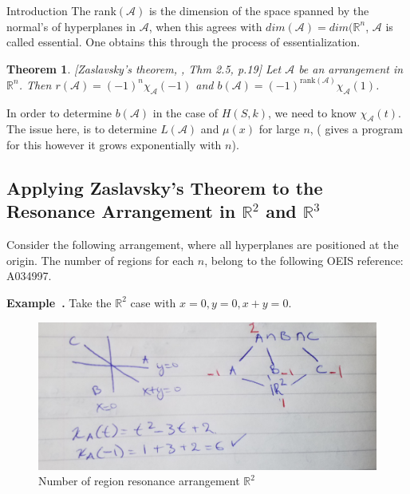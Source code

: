 \documentclass[a4paper,12pt]{article}
\newcounter{example}[]
\newenvironment{example}[1][]{\refstepcounter{example}\par\medskip
   \noindent \textbf{Example~\theexample. #1} \rmfamily}{\medskip}
\newtheorem{theorem}{Theorem}[section]
\theoremstyle{definition}
\theoremstyle{indented}
\begin{document}
\begin{section}{Introduction}
The rank$(\mathcal{A})$ is the dimension of the space spanned by the normal's of hyperplanes in $\mathcal{A}$, when this agrees with $dim(\mathcal{A})=dim(\mathbb{R}^n$, $\mathcal{A}$ is called essential. One obtains this through the process of essentialization.  

\begin{theorem}\label{Zas}[Zaslavsky's theorem, \cite{stanley2004introduction}, Thm 2.5, p.19] Let $\mathcal{A}$ be an arrangement in $\mathbb{R}^n$. Then $r(\mathcal{A})=(-1)^n \chi_{\mathcal{A}} (-1)$ and $b(\mathcal{A})=(-1)^{\text{rank}(\mathcal{A}) }  \chi_{\mathcal{A}} (1)$. 

\end{theorem}

In order to determine $b(\mathcal{A})$ in the case of $H(S,k)$, we need to know $\chi_{{\mathcal{A}}} (t)$. The issue here, is to determine $L(\mathcal{A})$ and $\mu(x)$ for large $n$, (\cite{Etu} gives a program for this however it grows exponentially with $n$). 

\section{Applying Zaslavsky's Theorem to the Resonance Arrangement in $\mathbb{R}^2$ and $\mathbb{R}^3$}

Consider the following arrangement, where all hyperplanes are positioned at the origin. The number of regions for each $n$, belong to the following OEIS reference: A034997.

\begin{example}
Take the $\mathbb{R}^2$ case with $x=0,y=0, x+y=0$. 

\begin{figure}[H]
    \centering
 \includegraphics[scale=0.10,angle=0]{29072020 pics/resonance R2.jpg}  
    \caption{Number of region resonance arrangement $\mathbb{R}^2$}
    \label{res}
\end{figure}
\end{example}



\end{section}
\end{document}
